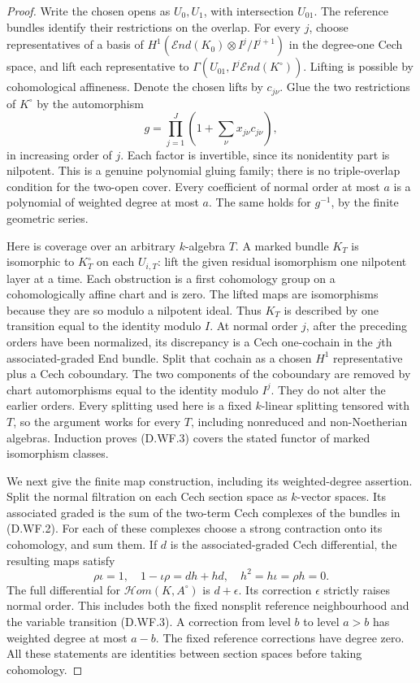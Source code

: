 \begin{proof}
Write the chosen opens as $U_0,U_1$, with intersection $U_{01}$.
The reference bundles identify their restrictions on the overlap.
For every $j$, choose representatives of a basis of
$H^1(\mathcal End(K_0)\otimes I^j/I^{j+1})$ in the degree-one
Cech space, and lift each representative to
$\Gamma(U_{01},I^j\mathcal End(K^\circ))$.
Lifting is possible by cohomological affineness. Denote the
chosen lifts by $c_{j\nu}$. Glue the two restrictions of
$K^\circ$ by the automorphism
\[
          g=\prod_{j=1}^{J}
                   \left(1+\sum_\nu x_{j\nu}c_{j\nu}\right),
                                                        \tag{D.WF.3}
\]
in increasing order of $j$. Each factor is invertible, since its
nonidentity part is nilpotent. This is a genuine polynomial
gluing family; there is no triple-overlap condition for the
two-open cover. Every coefficient of normal order at most $a$
is a polynomial of weighted degree at most $a$. The same holds
for $g^{-1}$, by the finite geometric series.

Here is coverage over an arbitrary $k$-algebra $T$. A marked
bundle $K_T$ is isomorphic to $K^\circ_T$ on each $U_{i,T}$:
lift the given residual isomorphism one nilpotent layer at a
time. Each obstruction is a first cohomology group on a
cohomologically affine chart and is zero. The lifted maps are
isomorphisms because they are so modulo a nilpotent ideal.
Thus $K_T$ is described by one transition equal to the identity
modulo $I$. At normal order $j$, after the preceding orders
have been normalized, its discrepancy is a Cech one-cochain
in the $j$th associated-graded End bundle. Split that cochain
as a chosen $H^1$ representative plus a Cech coboundary.
The two components of the coboundary are removed by chart
automorphisms equal to the identity modulo $I^j$. They do not
alter the earlier orders. Every splitting used here is a
fixed $k$-linear splitting tensored with $T$, so the argument
works for every $T$, including nonreduced and non-Noetherian
algebras. Induction proves (D.WF.3) covers the stated functor
of marked isomorphism classes.

We next give the finite map construction, including its
weighted-degree assertion. Split the normal filtration on
each Cech section space as $k$-vector spaces. Its associated
graded is the sum of the two-term Cech complexes of the
bundles in (D.WF.2). For each of these complexes choose a
strong contraction onto its cohomology, and sum them. If $d$
is the associated-graded Cech differential, the resulting
maps satisfy
\[
 \rho\iota=1,\quad
 1-\iota\rho=dh+hd,\quad
 h^2=h\iota=\rho h=0.                                  \tag{D.WF.4}
\]
The full differential for $\mathcal Hom(K,A^\circ)$ is
$d+\epsilon$. Its correction $\epsilon$ strictly raises
normal order. This includes both the fixed nonsplit
reference neighbourhood and the variable transition (D.WF.3).
A correction from level $b$ to level $a>b$ has weighted
degree at most $a-b$. The fixed reference corrections have
degree zero. All these statements are identities between
section spaces before taking cohomology.


\end{proof}
